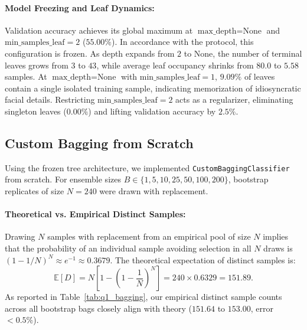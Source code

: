 \documentclass[10pt,twocolumn,letterpaper]{article}
\begin{document}
\paragraph{Model Freezing and Leaf Dynamics:}
Validation accuracy achieves its global maximum at $\text{max\_depth}=\text{None}$ and $\text{min\_samples\_leaf}=2$ ($55.00\%$). In accordance with the protocol, this configuration is frozen. As depth expands from $2$ to $\text{None}$, the number of terminal leaves grows from $3$ to $43$, while average leaf occupancy shrinks from $80.0$ to $5.58$ samples. At $\text{max\_depth}=\text{None}$ with $\text{min\_samples\_leaf}=1$, $9.09\%$ of leaves contain a single isolated training sample, indicating memorization of idiosyncratic facial details. Restricting $\text{min\_samples\_leaf}=2$ acts as a regularizer, eliminating singleton leaves ($0.00\%$) and lifting validation accuracy by $2.5\%$.

\subsection{Custom Bagging from Scratch}
Using the frozen tree architecture, we implemented \texttt{CustomBaggingClassifier} from scratch. For ensemble sizes $B \in \{1, 5, 10, 25, 50, 100, 200\}$, bootstrap replicates of size $N=240$ were drawn with replacement.

\paragraph{Theoretical vs. Empirical Distinct Samples:}
Drawing $N$ samples with replacement from an empirical pool of size $N$ implies that the probability of an individual sample avoiding selection in all $N$ draws is $(1 - 1/N)^N \approx e^{-1} \approx 0.3679$. The theoretical expectation of distinct samples is:
\begin{equation}
    \mathbb{E}[D] = N \left[1 - \left(1 - \frac{1}{N}\right)^N\right] = 240 \times 0.6329 = 151.89.
\end{equation}
As reported in Table~\ref{tab:q1_bagging}, our empirical distinct sample counts across all bootstrap bags closely align with theory ($151.64$ to $153.00$, error $< 0.5\%$).
\end{document}
